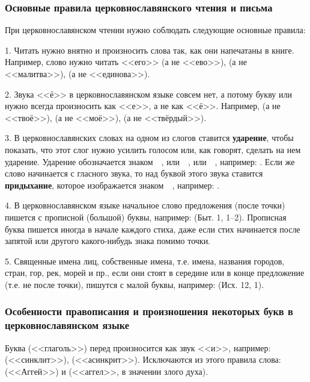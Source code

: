 \documentclass[11pt,a4paper,oneside]{memoir}
\begin{document}
                \subsubsection{Основные правила церковнославянского чтения и письма}
                
    При церковнославянском чтении нужно соблюдать следующие основные правила:
    
    1. Читать нужно внятно и произносить слова так, как они напечатаны в книге. Например, слово {} нужно читать <<его>> (а не <<ево>>), {} (а не <<малитва>>), {} (а не <<единова>>).
    
    2. Звука <<ё>> в церковнославянском языке совсем нет, а потому букву {} или {} нужно всегда произносить как <<е>>, а не как <<ё>>. Например, {} (а не <<твоё>>), {} (а не <<моё>>), {} (а не <<твёрдый>>).
    
    3. В церковнославянских словах на одном из слогов ставится \textbf{ударение}, чтобы показать, что этот слог нужно усилить голосом или, как говорят, сделать на нем ударение. Ударение обозначается знаком~~{}, или~~{}, или~~{}, например: {}. Если же слово начинается с гласного звука, то над буквой этого звука ставится \textbf{придыхание}, которое изображается знаком~~{}, например: {}.
    
    4. В церковнославянском языке начальное слово предложения (после точки) пишется с прописной (большой) буквы, например: {} (Быт. 1, 1--2). Прописная буква пишется иногда в начале каждого стиха, даже если стих начинается после запятой или другого какого-нибудь знака помимо точки.
    
    5. Священные имена лиц, собственные имена, т.е. имена, названия городов, стран, гор, рек, морей и пр., если они стоят в середине или в конце предложение (т.е. не после точки), пишутся с малой буквы, например: {} (Исх. 12, 1).


                \subsubsection{Особенности правописания и произношения некоторых букв в церковнославянском языке}

    Буква {} (<<глаголь>>) перед {} произносится как звук <<и>>, например: {} (<<синклит>>), {} (<<асинкрит>>). Исключаются из этого правила слова: {} (<<Аггей>>) и {} (<<аггел>>, в значении злого духа).
    
\end{document}
